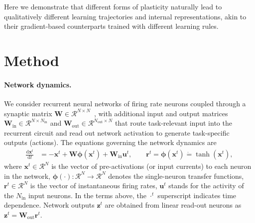 \documentclass[mlabstract]{jmlr}
\newcommand{\de}{\text{d}}
\begin{document}
Here we demonstrate that different forms of plasticity naturally lead to qualitatively different learning trajectories and internal representations, akin to their gradient-based counterparts trained with different learning rules.

\section{Method}


\paragraph{Network dynamics.} We consider recurrent neural networks of firing rate neurons coupled through a synaptic matrix ${\mathbf{W} \in \mathcal{R}^{N\times N}}$~\citep{sompolinsky1988chaos, barak2017recurrent}, with additional input and output matrices ${\mathbf{W}_{\text{in}} \in \mathcal{R}^{N\times N_{\text{in}}}}$ and ${\mathbf{W}_{\text{out}} \in \mathcal{R}^{N_{\text{out}}\times N }}$ that route task-relevant input into the recurrent circuit and read out network activation to generate task-specific outputs (actions). The equations governing the network dynamics are
\begin{align}\label{main-1}
\frac{\de \mathbf{x}^t}{\de t} &= -\mathbf{x}^t + \mathbf{W} \boldsymbol{\phi}({\mathbf{x}}^t) + \mathbf{W}_{\text{in}} \mathbf{u}^t,\quad \quad
\mathbf{r}^t = \boldsymbol{\phi}({\mathbf{x}}^t) \dot{=} \tanh{({\mathbf{x}}^t)},
\end{align}
where $\mathbf{x}^t \in \mathcal{R}^N$ is the vector of pre-activations (or input currents) to each neuron in the network,  $\boldsymbol{\phi}(\cdot):\mathcal{R}^N \rightarrow \mathcal{R}^N $ denotes the single-neuron transfer functions, $\mathbf{r}^t \in \mathcal{R}^N$ is the vector of instantaneous firing rates, $\mathbf{u}^t$ stands for the activity of the $N_{\text{in}}$ input neurons. In the terms above, the $\cdot^t$ superscript indicates time dependence.
Network outputs $\mathbf{z}^t$ are obtained from linear read-out neurons as
  $  \mathbf{z}^t = \mathbf{W}_{\text{out}} \mathbf{r}^t.$
\end{document}
